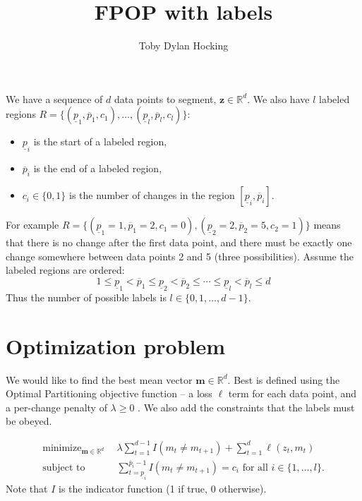 \documentclass{article}
\DeclareMathOperator*{\minimize}{minimize}
\newcommand{\RR}{\mathbb R}
\begin{document}
\title{FPOP with labels}
\author{Toby Dylan Hocking}
\maketitle

We have a sequence of $d$ data points to segment,
$\mathbf z\in\mathbb R^d$. We also have $l$ labeled regions
$R=\{(\underline p_1, \overline p_1, c_1), \dots,
(\underline p_l, \overline p_l, c_l)\}$:
\begin{itemize}
\item $\underline p_i$ is the start of a labeled region,
\item $\overline p_i$ is the end of a labeled region,
\item $c_i\in\{0,1\}$ is the number of changes in the region
  $[\underline p_i, \overline p_i]$. 
\end{itemize}
For example
$R=\{(\underline p_1=1,\overline p_1=2,c_1=0),(\underline
p_2=2,\overline p_2=5,c_2=1)\}$ means that there is no change after
the first data point, and there must be exactly one change somewhere
between data points 2 and 5 (three possibilities). Assume the
labeled regions are ordered:
\begin{equation}
  \label{eq:sorted}
  1 \leq 
\underline p_1 < \overline p_1 \leq 
\underline p_2 < \overline p_2 \leq
\cdots \leq 
\underline p_l < \overline p_l \leq 
d
\end{equation}
Thus the number of possible labels is $l\in\{0, 1, \dots, d-1\}$.

\section{Optimization problem}

We would like to find the best mean vector $\mathbf m\in\mathbb R^d$.
Best is defined using the Optimal Partitioning objective function -- a
loss $\ell$ term for each data point, and a per-change penalty of
$\lambda\geq 0$ \citep{Maidstone2016}. We also add the constraints that the
labels must be obeyed.

\begin{align}
\minimize_{
  \mathbf m\in\RR^{d}
  } &\ \ 
\lambda\sum_{t=1}^{d-1} I(m_t \neq m_{t+1})
+
\sum_{t=1}^d \ell(z_t, m_t) 
  \label{LabeledProb}
\\
    \text{subject to} 
& \ \ \sum_{t=\underline p_i}^{\overline p_i-1} I(m_t \neq m_{t+1})=c_i
\text{ for all } i\in\{1,\dots,l\}.
\nonumber
\end{align}
Note that $I$ is the indicator function (1 if true, 0 otherwise).
\end{document}
